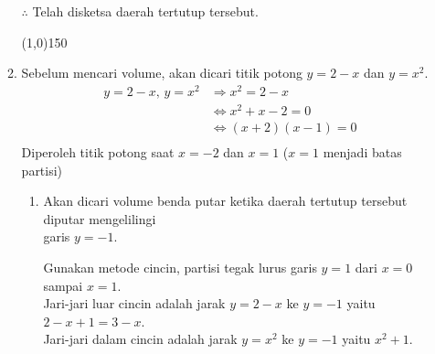 \begin{enumerate}[leftmargin=*, label={\arabic*}.]
\begin{enumerate}[label={\alph*}.]
$\therefore$ Telah disketsa daerah tertutup tersebut.
\begin{center}
    \line(1,0){150}
\end{center}
    \item Sebelum mencari volume, akan dicari titik potong $y=2-x$ dan $y=x^{2}$.
    \begin{align*}
        y=2-x,\,y=x^{2} &\Longrightarrow x^{2}=2-x\\
        &\iff x^{2}+x-2 = 0\\
        &\iff (x+2)(x-1) = 0\\
    \end{align*}
    Diperoleh titik potong saat $x=-2$ dan $x=1$ ($x=1$ menjadi batas partisi)
    \begin{enumerate}[label={\roman*}.]
        \item Akan dicari volume benda putar ketika daerah tertutup tersebut 
        diputar mengelilingi \\garis $y=-1$.

        Gunakan metode cincin, partisi tegak lurus garis $y=1$ dari $x=0$ 
        sampai $x=1$.\\
        Jari-jari luar cincin adalah jarak $y=2-x$ ke $y=-1$ yaitu $2-x+1=3-x$.\\
        Jari-jari dalam cincin adalah jarak $y=x^2$ ke $y=-1$ yaitu $x^{2}+1$.


\end{enumerate}
\end{enumerate}
\end{enumerate}
